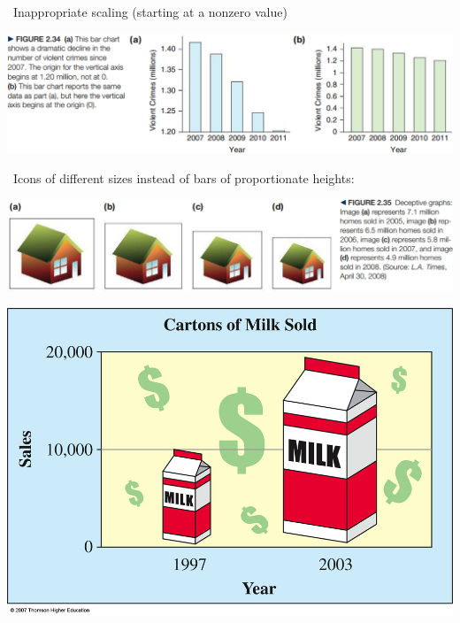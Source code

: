 \documentclass[../mathNotesPreamble]{subfiles}
\begin{document}
  \noindent\textbullet\ Inappropriate scaling (starting at a nonzero value)
  \begin{center}
    \includegraphics[width=0.95\linewidth]{images/math211_figure_2p34}
  \end{center}
  \pagebreak
  \noindent\textbullet\ Icons of different sizes instead of bars of proportionate heights:
  \begin{center}
    \includegraphics[width=0.95\linewidth]{images/math211_figure_2p35}

    \includegraphics[width=0.65\linewidth]{images/math211_milk_icon}
  \end{center}
  \pagebreak
\end{document}
